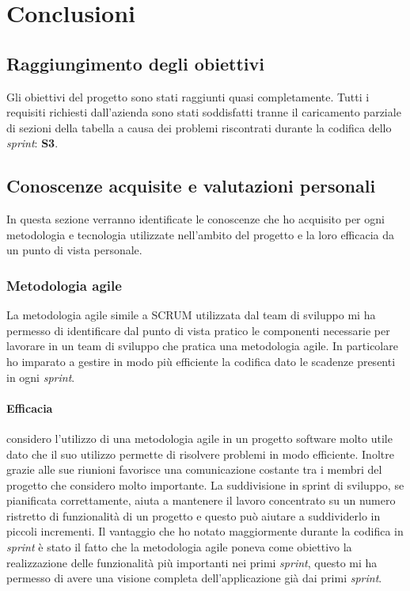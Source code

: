 
\chapter{Conclusioni}
\label{cap:conclusioni}
\section{Raggiungimento degli obiettivi}
Gli obiettivi del progetto sono stati raggiunti quasi completamente. Tutti i requisiti richiesti dall'azienda sono stati soddisfatti tranne il caricamento parziale di sezioni della tabella a causa dei problemi riscontrati durante la codifica dello \emph{sprint}: \textbf{S3}.

\section{Conoscenze acquisite e valutazioni personali}
In questa sezione verranno identificate le conoscenze che ho acquisito per ogni metodologia e tecnologia utilizzate nell'ambito del progetto e la loro efficacia da un punto di vista personale.

\subsection{Metodologia agile}
La metodologia agile simile a SCRUM utilizzata dal team di sviluppo mi ha permesso di identificare dal punto di vista pratico le componenti necessarie per lavorare in un team di sviluppo che pratica una metodologia agile. In particolare ho imparato a gestire in modo più efficiente la codifica dato le scadenze presenti in ogni \emph{sprint}. 

\subsubsection*{Efficacia}
considero l'utilizzo di una metodologia agile in un progetto software molto utile dato che il suo utilizzo permette di risolvere problemi in modo efficiente. Inoltre grazie alle sue riunioni favorisce una comunicazione costante tra i membri del progetto che considero molto importante. La suddivisione in sprint di sviluppo, se pianificata correttamente, aiuta a mantenere il lavoro concentrato su un numero ristretto di funzionalità di un progetto e questo può aiutare a suddividerlo in piccoli incrementi. Il vantaggio che ho notato maggiormente durante la codifica in \emph{sprint} è stato il fatto che la metodologia agile poneva come obiettivo la realizzazione delle funzionalità più importanti nei primi \emph{sprint}, questo mi ha permesso di avere una visione completa dell'applicazione già dai primi \emph{sprint}.

